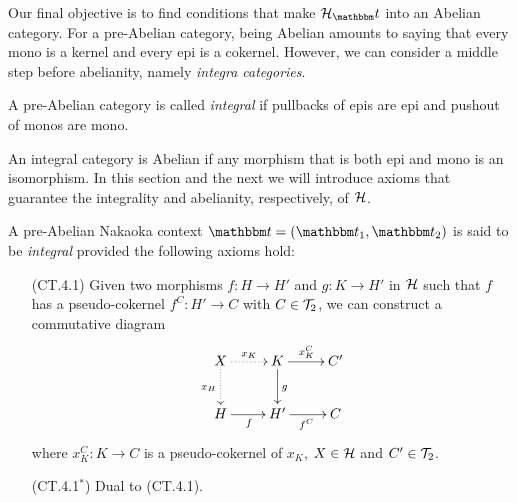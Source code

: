 Our final objective is to find conditions that make $\clH_\t$ into an Abelian category. For a pre-Abelian category, being Abelian amounts to saying that every mono is a kernel and every epi is a cokernel. However, we can consider a middle step before abelianity, namely \emph{integra categories}.

\begin{definition}
  A pre-Abelian category is called \emph{integral} if pullbacks of epis are epi and pushout of monos are mono.
\end{definition}

An integral category is Abelian if any morphism that is both epi and mono is an isomorphism. In this section and the next we will introduce axioms that guarantee the integrality and abelianity, respectively, of $\mathcal{H}$.

\begin{definition}
A pre-Abelian Nakaoka context $\t=(\t_1,\t_2)$ is said to be \emph{integral} provided the following axioms hold:
\begin{enumerate}
\item[(CT.4.1)] Given two morphisms $f\colon H\to H'$ and $g\colon K\to H'$ in $\mathcal{H}$ such that $f$ has a pseudo-cokernel $f^C\colon H'\to C$ with $C\in \mathcal{T}_2$, we can construct a commutative diagram
\[
\xymatrix{
X\ar@{.>}[d]_{x_H}\ar@{.>}[r]^{x_K}&K\ar[r]^{x_K^C}\ar[d]^{g}&C'\\
H\ar[r]_f&H'\ar[r]_{f^C}&C
}
\]
where $x_K^C\colon K\to C$ is a pseudo-cokernel of $x_K$, $X\in \mathcal{H}$ and $C'\in \mathcal{T}_2$.
\item[(CT.4.1$^*$)]  Dual to (CT.4.1).
\end{enumerate}
\end{definition}

